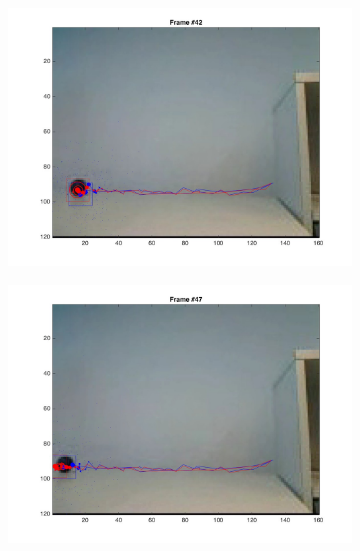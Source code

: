 \documentclass{ethz_report}
\begin{document}
\begin{figure}[h]
\begin{subfigure}[b]{.25\textwidth}
        \includegraphics[width=1\linewidth]{images/video3_bins_low_41}
    \end{subfigure}%
    \begin{subfigure}[b]{.25\textwidth}
        \centering
        \includegraphics[width=1\linewidth]{images/video3_bins_low_46}
    \end{subfigure}%
    \begin{subfigure}[b]{.25\textwidth}
        \centering

\end{subfigure}
\end{figure}
\end{document}
